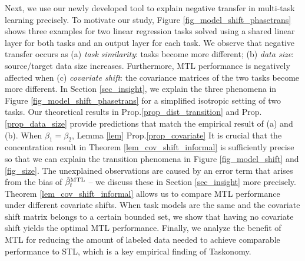 Next, we use our newly developed tool to explain negative transfer in multi-task learning precisely.
To motivate our study, Figure \ref{fig_model_shift_phasetrans} shows three examples for two linear regression tasks solved using a shared linear layer for both tasks and an output layer for each task.
We observe that negative transfer occurs as (a) \textit{task similarity}: tasks become more different; (b) \textit{data size}: source/target data size increases.
Furthermore, MTL performance is negatively affected when (c) \textit{covariate shift}: the covariance matrices of the two tasks become more different.
In Section \ref{sec_insight}, we explain the three phenomena in Figure \ref{fig_model_shift_phasetrans} for a simplified isotropic setting of two tasks.
Our theoretical results in Prop.\;\ref{prop_dist_transition} and Prop.\;\ref{prop_data_size} provide predictions that match the empirical result of (a) and (b).
When $\beta_1 = \beta_2$, Lemma \ref{lem} Prop.\;\ref{prop_covariate}
It is crucial that the concentration result in Theorem \ref{lem_cov_shift_informal} is sufficiently precise so that we can explain the transition phenomena in Figure \ref{fig_model_shift} and \ref{fig_size}.
The unexplained observations are caused by an error term that arises from the bias of $\hat{\beta}_t^{\text{MTL}}$ -- we discuss these in Section \ref{sec_insight} more precisely.
Theorem \ref{lem_cov_shift_informal} allows us to compare MTL performance under different covariate shifts.
When task models are the same and the covariate shift matrix belongs to a certain bounded set, we show that having no covariate shift yields the optimal MTL performance.
Finally, we analyze the benefit of MTL for reducing the amount of labeled data needed to achieve comparable performance to STL, which is a key empirical finding of Taskonomy.


